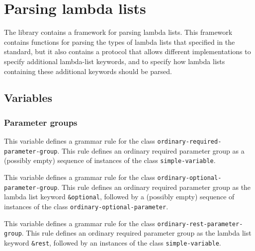 \chapter{Parsing lambda lists}
\label{chap-user-parsing-lambda-lists}

The \sysname{} library contains a framework for parsing lambda lists.
This framework contains functions for parsing the types of lambda
lists that specified in the \commonlisp{} standard, but it also
contains a protocol that allows different implementations to specify
additional lambda-list keywords, and to specify how lambda lists
containing these additional keywords should be parsed.

\section{Variables}

\subsection{Parameter groups}


This variable defines a grammar rule for the class
\texttt{ordinary-required-parameter-group}.  This rule defines an
ordinary required parameter group as a (possibly empty) sequence of
instances of the class \texttt{simple-variable}.


This variable defines a grammar rule for the class
\texttt{ordinary-optional-parameter-group}.  This rule defines an
ordinary required parameter group as the lambda list keyword
\texttt{\&optional}, followed by a (possibly empty) sequence of
instances of the class \texttt{ordinary-optional-parameter}.


This variable defines a grammar rule for the class
\texttt{ordinary-rest-parameter-group}.  This rule defines an
ordinary required parameter group as the lambda list keyword
\texttt{\&rest}, followed by an instances of the class
\texttt{simple-variable}.






